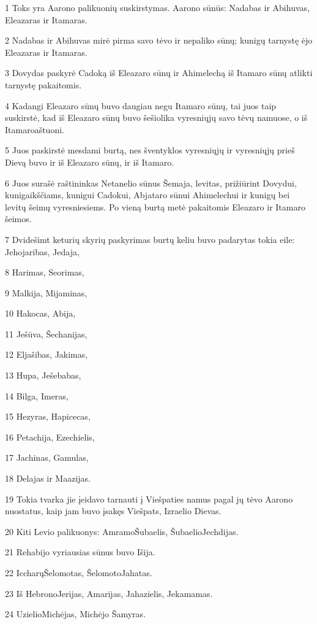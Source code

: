 \par 1 Toks yra Aarono palikuonių suskirstymas. Aarono sūnūs: Nadabas ir Abihuvas, Eleazaras ir Itamaras. 
\par 2 Nadabas ir Abihuvas mirė pirma savo tėvo ir nepaliko sūnų; kunigų tarnystę ėjo Eleazaras ir Itamaras. 
\par 3 Dovydas paskyrė Cadoką iš Eleazaro sūnų ir Ahimelechą iš Itamaro sūnų atlikti tarnystę pakaitomis. 
\par 4 Kadangi Eleazaro sūnų buvo daugiau negu Itamaro sūnų, tai juos taip suskirstė, kad iš Eleazaro sūnų buvo šešiolika vyresniųjų savo tėvų namuose, o iš Itamaro­aštuoni. 
\par 5 Juos paskirstė mesdami burtą, nes šventyklos vyresniųjų ir vyresniųjų prieš Dievą buvo ir iš Eleazaro sūnų, ir iš Itamaro. 
\par 6 Juos surašė raštininkas Netanelio sūnus Šemaja, levitas, prižiūrint Dovydui, kunigaikščiams, kunigui Cadokui, Abjataro sūnui Ahimelechui ir kunigų bei levitų šeimų vyresniesiems. Po vieną burtą metė pakaitomis Eleazaro ir Itamaro šeimos. 
\par 7 Dvidešimt keturių skyrių paskyrimas burtų keliu buvo padarytas tokia eile: Jehojaribas, Jedaja, 
\par 8 Harimas, Seorimas, 
\par 9 Malkija, Mijaminas, 
\par 10 Hakocas, Abija, 
\par 11 Ješūva, Šechanijas, 
\par 12 Eljašibas, Jakimas, 
\par 13 Hupa, Ješebabas, 
\par 14 Bilga, Imeras, 
\par 15 Hezyras, Hapicecas, 
\par 16 Petachija, Ezechielis, 
\par 17 Jachinas, Gamulas, 
\par 18 Delajas ir Maazijas. 
\par 19 Tokia tvarka jie įeidavo tarnauti į Viešpaties namus pagal jų tėvo Aarono nuostatus, kaip jam buvo įsakęs Viešpats, Izraelio Dievas. 
\par 20 Kiti Levio palikuonys: Amramo­Šubaelis, Šubaelio­Jechdijas. 
\par 21 Rehabijo vyriausias sūnus buvo Išija. 
\par 22 Iccharų­Šelomotas, Šelomoto­Jahatas. 
\par 23 Iš Hebrono­Jerijas, Amarijas, Jahazielis, Jekamamas. 
\par 24 Uzielio­Michėjas, Michėjo­ Šamyras. 
